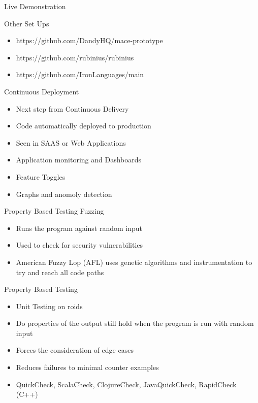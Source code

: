 \documentclass{beamer}
\begin{document}
\begin{frame}{Live Demonstration}
\end{frame}

\begin{frame}{Other Set Ups}
	\begin{itemize}
		\item https://github.com/DandyHQ/mace-prototype
		\item https://github.com/rubinius/rubinius
		\item https://github.com/IronLanguages/main
	\end{itemize}
\end{frame}

\begin{frame}{Continuous Deployment}
	\begin{itemize}
		\item Next step from Continuous Delivery
		\item Code automatically deployed to production
		\item Seen in SAAS or Web Applications
		\item Application monitoring and Dashboards
		\item Feature Toggles
		\item Graphs and anomoly detection
	\end{itemize}
\end{frame}

\begin{frame}{Property Based Testing}
	Fuzzing
	\begin{itemize}
		\item Runs the program against random input
		\item Used to check for security vulnerabilities
		\item American Fuzzy Lop (AFL) uses genetic algorithms and instrumentation to try and reach all code paths
	\end{itemize}
	Property Based Testing
	\begin{itemize}
		\item Unit Testing on roids
		\item Do properties of the output still hold when the program is run with random input
		\item Forces the consideration of edge cases
		\item Reduces failures to minimal counter examples
		\item QuickCheck, ScalaCheck, ClojureCheck, JavaQuickCheck, RapidCheck (C++)
	\end{itemize}
\end{frame}
\end{document}
